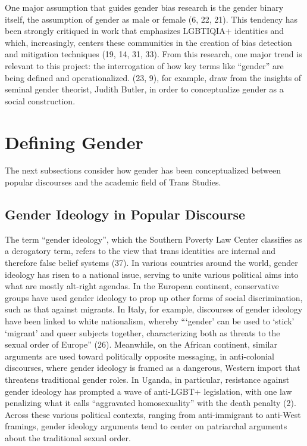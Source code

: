 \documentclass[11pt]{article}
\begin{document}
One major assumption that guides gender bias research is the gender binary itself, the assumption of gender as male or female (6, 22, 21). This tendency has been strongly critiqued in work that emphasizes LGBTIQIA+ identities and which, increasingly, centers these communities in the creation of bias detection and mitigation techniques (19, 14, 31, 33). From this research, one major trend is relevant to this project: the interrogation of how key terms like “gender” are being defined and operationalized. (23, 9), for example, draw from the insights of seminal gender theorist, Judith Butler, in order to conceptualize gender as a social construction. 

\section{Defining Gender}

The next subsections consider how gender has been conceptualized between popular discourses and the academic field of Trans Studies.

\subsection{Gender Ideology in Popular Discourse}
The term “gender ideology”, which the Southern Poverty Law Center classifies as a derogatory term, refers to the view that trans identities are internal and therefore false belief systems (37). In various countries around the world, gender ideology has risen to a national issue, serving to unite various political aims into what are mostly alt-right agendas. In the European continent, conservative groups have used gender ideology to prop up other forms of social discrimination, such as that against migrants. In Italy, for example, discourses of gender ideology have been linked to white nationalism, whereby “‘gender’ can be used to ‘stick’ ‘migrant’ and queer subjects together, characterizing both as threats to the sexual order of Europe” (26). Meanwhile, on the African continent, similar arguments are used toward politically opposite messaging, in anti-colonial discourses, where gender ideology is framed as a dangerous, Western import that threatens traditional gender roles. In Uganda, in particular, resistance against gender ideology has prompted a wave of anti-LGBT+ legislation, with one law penalizing what it calls “aggravated homosexuality” with the death penalty (2). Across these various political contexts, ranging from anti-immigrant to anti-West framings, gender ideology arguments tend to center on patriarchal arguments about the traditional sexual order.
\end{document}

